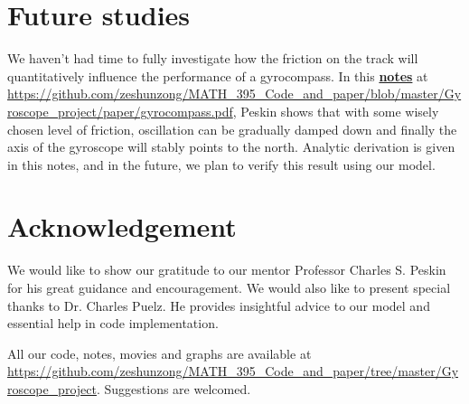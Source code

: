 \documentclass[12pt]{article}
\renewcommand{\(}{\left (}
\renewcommand{\)}{\right )}
\begin{document}
\section{Future studies}
\hspace{5mm} We haven't had time to fully investigate how the friction on the track will quantitatively influence the performance of a gyrocompass. In this \href{https://github.com/zeshunzong/MATH_395_Code_and_paper/blob/master/Gyroscope_project/paper/gyrocompass.pdf}{\textbf{notes}} at \url{https://github.com/zeshunzong/MATH_395_Code_and_paper/blob/master/Gyroscope_project/paper/gyrocompass.pdf}, Peskin shows that with some wisely chosen level of friction, oscillation can be gradually damped down and finally the axis of the gyroscope will stably points to the north. Analytic derivation is given in this notes, and in the future, we plan to verify this result using our model.




\section{Acknowledgement}

\hspace{5mm} We would like to show our gratitude to our mentor Professor Charles S. Peskin for his great guidance and encouragement. We would also like to present special thanks to Dr. Charles Puelz. He provides insightful advice to our model and essential help in code implementation.

All our code, notes, movies and graphs are available at \url{https://github.com/zeshunzong/MATH_395_Code_and_paper/tree/master/Gyroscope_project}. Suggestions are welcomed.
\end{document}
